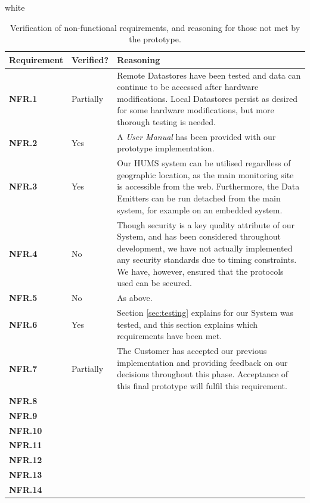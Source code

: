 \documentclass[10pt,a4paper]{article}
\newcommand{\tableformat}[4]{
\begin{table}[ht!]
\centering
  \rowcolors{2}{gray!10} {white}
\def\arraystretch{1.5}
\begin{tabularx}{\textwidth}{#1}
  \hline
  \rowcolor[gray]{0.9} #2
  \hline
\end{tabularx}
\caption{#3}
\label{#4}
\end{table}}
\newcommand{\nfr}[1]{\textcolor{reqColor}{\textbf{NFR.#1}}}
\begin{document}
\tableformat{ p{2cm}  p{2cm} X }{
Requirement & Verified? & Reasoning \\ \hline
\nfr{1} & Partially & Remote Datastores have been tested and data can continue to be accessed after hardware modifications. Local Datastores persist as desired for some hardware modifications, but more thorough testing is needed.\\
\nfr{2} & Yes & A \emph{User Manual} has been provided with our prototype implementation. \\
\nfr{3} & Yes & Our HUMS system can be utilised regardless of geographic location, as the main monitoring site is accessible from the web. Furthermore, the Data Emitters can be run detached from the main system, for example on an embedded system. \\
\nfr{4} & No & Though security is a key quality attribute of our System, and has been considered throughout development, we have not actually implemented any security standards due to timing constraints. We have, however, ensured that the protocols used can be secured.\\
\nfr{5} & No & As above.\\
\nfr{6} & Yes & Section \ref{sec:testing} explains for our System was tested, and this section explains which requirements have been met.\\
\nfr{7} & Partially & The Customer has accepted our previous implementation and providing feedback on our decisions throughout this phase. Acceptance of this final prototype will fulfil this requirement.\\
\nfr{8} & & \\
\nfr{9} & & \\
\nfr{10} & & \\
\nfr{11} & & \\
\nfr{12} & & \\
\nfr{13} & & \\
\nfr{14} & & \\
}{Verification of non-functional requirements, and reasoning for those not met by the prototype.}{tab:nonfunctionalEval}


\end{document}
